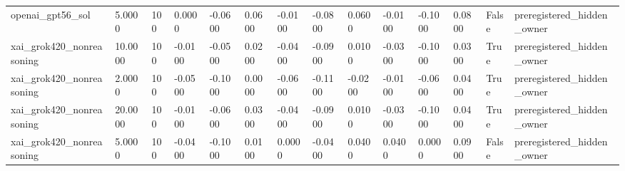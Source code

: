 \begin{tabular}{llllllllllllll}
openai\_gpt56\_sol & 5.0000 & 100 & 0.0000 & -0.0600 & 0.0600 & -0.0100 & -0.0800 & 0.0600 & -0.0100 & -0.1000 & 0.0800 & False & preregistered\_hidden\_owner \\
xai\_grok420\_nonreasoning & 10.0000 & 100 & -0.0100 & -0.0500 & 0.0200 & -0.0400 & -0.0900 & 0.0100 & -0.0300 & -0.1000 & 0.0300 & True & preregistered\_hidden\_owner \\
xai\_grok420\_nonreasoning & 2.0000 & 100 & -0.0500 & -0.1000 & 0.0000 & -0.0600 & -0.1100 & -0.0200 & -0.0100 & -0.0600 & 0.0400 & True & preregistered\_hidden\_owner \\
xai\_grok420\_nonreasoning & 20.0000 & 100 & -0.0100 & -0.0600 & 0.0300 & -0.0400 & -0.0900 & 0.0100 & -0.0300 & -0.1000 & 0.0400 & True & preregistered\_hidden\_owner \\
xai\_grok420\_nonreasoning & 5.0000 & 100 & -0.0400 & -0.1000 & 0.0100 & 0.0000 & -0.0400 & 0.0400 & 0.0400 & 0.0000 & 0.0900 & False & preregistered\_hidden\_owner \\
\bottomrule
\end{tabular}

